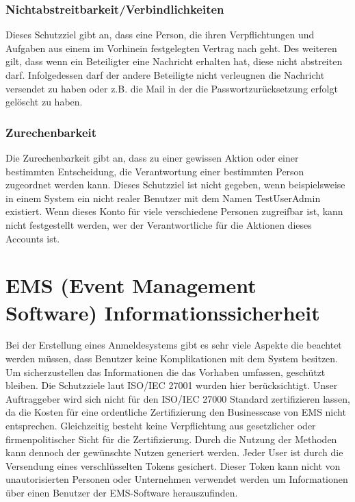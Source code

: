 \subsubsection{Nichtabstreitbarkeit/Verbindlichkeiten}
Dieses Schutzziel gibt an, dass eine Person, die ihren Verpflichtungen und Aufgaben aus einem im Vorhinein festgelegten Vertrag nach geht. Des weiteren gilt, dass wenn ein Beteiligter eine Nachricht erhalten hat, diese nicht abstreiten darf. Infolgedessen darf der andere Beteiligte nicht verleugnen die Nachricht versendet zu haben oder z.B. die Mail in der die Passwortzurücksetzung erfolgt gelöscht zu haben.

\subsubsection{Zurechenbarkeit}
Die Zurechenbarkeit gibt an, dass zu einer gewissen Aktion oder einer bestimmten Entscheidung, die Verantwortung einer bestimmten Person zugeordnet werden kann. Dieses Schutzziel ist nicht gegeben, wenn beispielsweise in einem System ein nicht realer Benutzer mit dem Namen TestUserAdmin existiert. Wenn dieses Konto für viele verschiedene Personen zugreifbar ist, kann nicht festgestellt werden, wer der Verantwortliche für die Aktionen dieses Accounts ist.

\section{EMS (Event Management Software) Informationssicherheit}
Bei der Erstellung eines Anmeldesystems gibt es sehr viele Aspekte die beachtet werden müssen, dass Benutzer keine Komplikationen mit dem System besitzen. Um sicherzustellen das Informationen die das Vorhaben umfassen, geschützt bleiben. Die Schutzziele laut ISO/IEC 27001 wurden hier berücksichtigt. Unser Auftraggeber wird sich nicht für den ISO/IEC 27000 Standard zertifizieren lassen, da die Kosten für eine ordentliche Zertifizierung den Businesscase von EMS nicht entsprechen. Gleichzeitig besteht keine Verpflichtung aus gesetzlicher oder firmenpolitischer Sicht für die Zertifizierung. Durch die Nutzung der Methoden kann dennoch der gewünschte Nutzen generiert werden.
Jeder User ist durch die Versendung eines verschlüsselten Tokens gesichert. Dieser Token kann nicht von unautorisierten Personen oder Unternehmen verwendet werden um Informationen über einen Benutzer der EMS-Software herauszufinden. 

